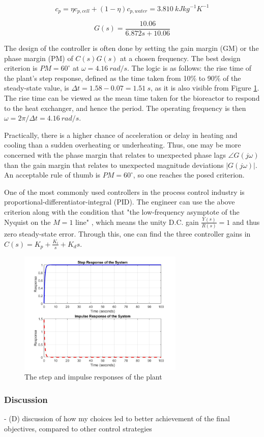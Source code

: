 \vspace{-5mm}
\begin{equation}
    c_p = \eta c_{p, cell} + (1-\eta) c_{p, water} = 3.810 \ kJ kg^{-1} K^{-1}
    \label{equation:E-temp-5}
\end{equation}

\vspace{-10mm}
\begin{equation}
    G(s) = \frac{10.06}{6.872 s + 10.06}
    \label{equation:E-temp-6}
\end{equation}

The design of the controller is often done by setting the gain margin (GM) or the phase margin (PM) of $C(s)G(s)$ at a chosen frequency. The best design criterion is $PM = 60 ^{\circ}$ at $\omega = 4.16 \ rad/s$. The logic is as follows: the rise time of the plant's step response, defined as the time taken from 10\% to 90\% of the steady-state value, is $\Delta t = 1.58 - 0.07 = 1.51 \ s$, as it is also visible from Figure \ref{figure:E-1-4-step-and-impulse}. The rise time can be viewed as the mean time taken for the bioreactor to respond to the heat exchanger, and hence the period. The operating frequency is then $\omega = 2\pi / \Delta t = 4.16 \ rad/s$.

Practically, there is a higher chance of acceleration or delay in heating and cooling than a sudden overheating or underheating. Thus, one may be more concerned with the phase margin that relates to unexpected phase lags $\angle G(j \omega)$ than the gain margin that relates to unexpected magnitude deviations $|G(j \omega)|$. An acceptable rule of thumb is $PM = 60 ^{\circ}$, so one reaches the posed criterion.

One of the most commonly used controllers in the process control industry is proportional-differentiator-integral (PID). The engineer can use the above criterion along with the condition that "the low-frequency asymptote of the Nyquist on the $M=1$ line" \cite{E-Cannon2022-2}, which means the unity D.C. gain $\frac{Y(s)}{R(s)} = 1$ and thus zero steady-state error. Through this, one can find the three controller gains in $C(s) = K_p + \frac{K_i}{s} + K_d s$.

\begin{figure}[h]
    \centering
    \includegraphics[width=0.7\textwidth]{E-1-4-step-and-impulse.jpg}
    \hfill
    \caption{The step and impulse responses of the plant}
    \label{figure:E-1-4-step-and-impulse}
\end{figure}

\vspace{-10mm}
\subsubsection{Discussion}
- (D) discussion of how my choices led to better achievement of the final objectives, compared to other control strategies